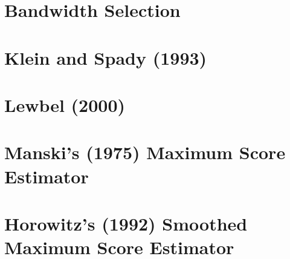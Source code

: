 \documentclass[xcolor=svgnames,dvipdfmx,cjk]{beamer}
\theoremstyle{example}
\begin{document}
\section{Bandwidth Selection}
\begin{frame}
  \tableofcontents[currentsection]
\end{frame}









\section{Klein and Spady (1993)}
\begin{frame}
  \tableofcontents[currentsection]
\end{frame}









\section{Lewbel (2000)}
\begin{frame}
  \tableofcontents[currentsection]
\end{frame}









\section{Manski's (1975) Maximum Score Estimator}
\begin{frame}
  \tableofcontents[currentsection]
\end{frame}









\section{Horowitz's (1992) Smoothed Maximum Score Estimator}
\begin{frame}
  \tableofcontents[currentsection]
\end{frame}
\end{document}
